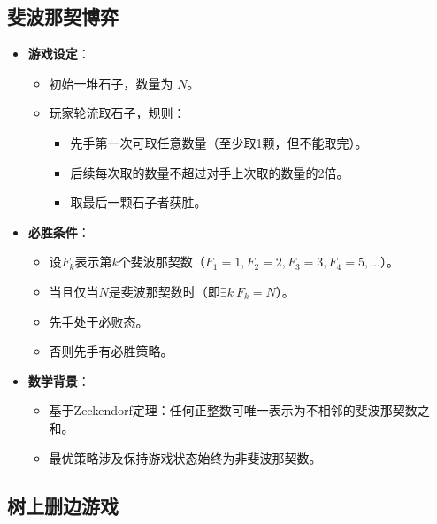 \documentclass[a4paper,12pt]{article}
\begin{document}
\subsection{斐波那契博弈}

\begin{itemize}
    \item \textbf{游戏设定}：
    \begin{itemize}
        \item 初始一堆石子，数量为 $N$。
        \item 玩家轮流取石子，规则：
        \begin{itemize}
            \item 先手第一次可取任意数量（至少取1颗，但不能取完）。
            \item 后续每次取的数量不超过对手上次取的数量的2倍。
            \item 取最后一颗石子者获胜。
        \end{itemize}
    \end{itemize}
    
    \item \textbf{必胜条件}：
    \begin{itemize}
        \item 设$F_k$表示第$k$个斐波那契数（$F_1=1, F_2=2, F_3=3, F_4=5, \ldots$）。
        \item 当且仅当$N$是斐波那契数时（即$\exists k\ F_k = N$）。
        \item 先手处于必败态。
        \item 否则先手有必胜策略。
    \end{itemize}
    
    \item \textbf{数学背景}：
    \begin{itemize}
        \item 基于Zeckendorf定理：任何正整数可唯一表示为不相邻的斐波那契数之和。
        \item 最优策略涉及保持游戏状态始终为非斐波那契数。
    \end{itemize}
\end{itemize}

\subsection{树上删边游戏}
\end{document}
